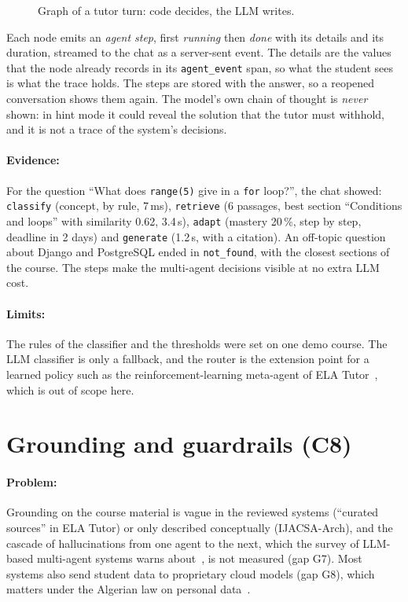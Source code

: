 \begin{figure}[htbp]
  \centering
  \caption{Graph of a tutor turn: code decides, the LLM writes.}
  \label{fig-tutor-graph}
\end{figure}

Each node emits an \emph{agent step}, first \emph{running} then
\emph{done} with its details and its duration, streamed to the chat as a
server-sent event. The details are the values that the node already
records in its \texttt{agent\_event} span, so what the student sees is
what the trace holds. The steps are stored with the answer, so a reopened
conversation shows them again. The model's own chain of thought is
\emph{never} shown: in hint mode it could reveal the solution that the
tutor must withhold, and it is not a trace of the system's decisions.

\paragraph{Evidence:} For the question ``What does \texttt{range(5)} give
in a \texttt{for} loop?'', the chat showed: \texttt{classify} (concept,
by rule, 7\,ms), \texttt{retrieve} (6 passages, best section ``Conditions
and loops'' with similarity 0.62, 3.4\,s), \texttt{adapt} (mastery 20\,\%,
step by step, deadline in 2 days) and \texttt{generate} (1.2\,s, with a
citation). An off-topic question about Django and PostgreSQL ended in
\texttt{not\_found}, with the closest sections of the course. The steps
make the multi-agent decisions visible at no extra LLM cost.

\paragraph{Limits:} The rules of the classifier and the thresholds were
set on one demo course. The LLM classifier is only a fallback, and the
router is the extension point for a learned policy such as the
reinforcement-learning meta-agent of ELA Tutor~\cite{lopezgoyez2026ela},
which is out of scope here.

\section[Grounding and guardrails]{Grounding and guardrails (C8)}
\label{sec-c5}

\paragraph{Problem:} Grounding on the course material is vague in the
reviewed systems (``curated sources'' in ELA Tutor) or only described
conceptually (IJACSA-Arch), and the cascade of hallucinations from one
agent to the next, which the survey of LLM-based multi-agent systems warns
about~\cite{guo2024mas}, is not measured (gap G7). Most systems also send
student data to proprietary cloud models (gap G8), which matters under
the Algerian law on personal data~\cite{algeria_law1807}.

